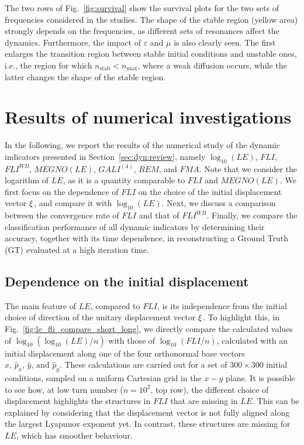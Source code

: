 %
The two rows of Fig.~\ref{fig:survival} show the survival plots for the two sets of frequencies considered in the studies. The shape of the stable region (yellow area) strongly depends on the frequencies, as different sets of resonances affect the dynamics. Furthermore, the impact of $\varepsilon$ and $\mu$ is also clearly seen. The first enlarges the transition region between stable initial conditions and unstable ones, i.e., the region for which $n_\mathrm{stab} < n_\mathrm{max}$, where a weak diffusion occurs, while the latter changes the shape of the stable region.
%
\section{\label{sec:dyn:results} Results of numerical investigations}
%
In the following, we report the results of the numerical study of the dynamic indicators presented in Section~\ref{sec:dyn:review}, namely $\log_{10}(LE)$, $FLI$, $FLI^{WB}$, $MEGNO(LE)$, $GALI^{(4)}$, $REM$, and $FMA$. Note that we consider the logarithm of $LE$, as it is a quantity comparable to $FLI$ and $MEGNO(LE)$. We first focus on the dependence of $FLI$ on the choice of the initial displacement vector $\vb{\xi}$, and compare it with $\log_{10}(LE)$. Next, we discuss a comparison between the convergence rate of $FLI$ and that of $FLI^{WB}$. Finally, we compare the classification performance of all dynamic indicators by determining their accuracy, together with its time dependence, in reconstructing a Ground Truth (GT) evaluated at a high iteration time.
%
\subsection{Dependence on the initial displacement}

The main feature of $LE$, compared to $FLI$, is its independence from the initial choice of direction of the unitary displacement vector $\vb{\xi}$. To highlight this, in Fig.~\ref{fig:le_fli_compare_short_long}, we directly compare the calculated values of $\log_{10}(\log_{10}(LE)/n)$ with those of $\log_{10}(FLI/n)$, calculated with an initial displacement along one of the four orthonormal base vectors $\hat{x},\,\hat{p}_x,\,\hat{y},\,\text{and }\hat{p}_y$. These calculations are carried out for a set of $300\times300$ initial conditions, sampled on a uniform Cartesian grid in the $x-y$ plane. It is possible to see how, at low turn number ($n=10^2$, top row), the different choice of displacement highlights the structures in $FLI$ that are missing in $LE$. This can be explained by considering that the displacement vector is not fully aligned along the largest Lyapunov exponent yet. In contrast, these structures are missing for $LE$, which has smoother behaviour.

